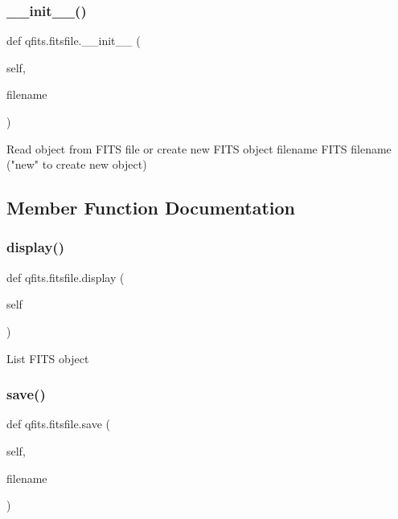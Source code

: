 \subsubsection{\texorpdfstring{\+\_\+\+\_\+init\+\_\+\+\_\+()}{\_\_init\_\_()}}
{\footnotesize\ttfamily def qfits.\+fitsfile.\+\_\+\+\_\+init\+\_\+\+\_\+ (\begin{DoxyParamCaption}\item[{}]{self,  }\item[{}]{filename }\end{DoxyParamCaption})}

\begin{DoxyVerb}Read object from FITS file or create new FITS object
   filename   FITS filename ("new" to create new object) 
\end{DoxyVerb}
 

\subsection{Member Function Documentation}
\mbox{\label{classqfits_1_1fitsfile_a1412887038ee0f4a85c28910ce26e8e8}} 
\subsubsection{\texorpdfstring{display()}{display()}}
{\footnotesize\ttfamily def qfits.\+fitsfile.\+display (\begin{DoxyParamCaption}\item[{}]{self }\end{DoxyParamCaption})}

\begin{DoxyVerb}List FITS object\end{DoxyVerb}
 \mbox{\label{classqfits_1_1fitsfile_a6e96ab1f3bf9615a62661840ec8ae145}} 
\subsubsection{\texorpdfstring{save()}{save()}}
{\footnotesize\ttfamily def qfits.\+fitsfile.\+save (\begin{DoxyParamCaption}\item[{}]{self,  }\item[{}]{filename }\end{DoxyParamCaption})}

